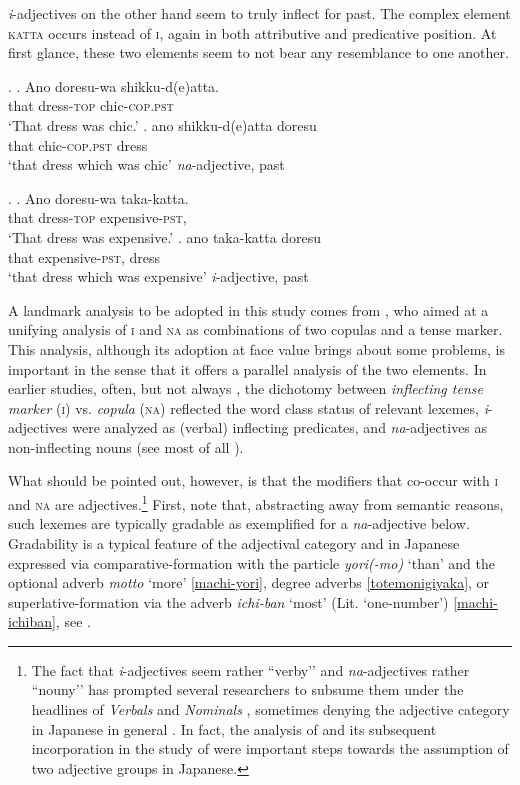 \documentclass [output=book,colorlinks,citecolor=brown]{langscibook}
\begin{document}
\textit{i}-adjectives on the other hand seem to truly inflect for past. The complex element \textsc{katta} occurs instead of \textsc{i}, again in both attributive and predicative position. At first glance, these two elements seem to not bear any resemblance to one another. %

\ex. \ag. Ano doresu-wa shikku-d(e)atta.\\
that dress-\textsc{top} chic-\textsc{cop.pst}\\
`That dress was chic.'
\bg. ano shikku-d(e)atta doresu\\
that chic-\textsc{cop.pst} dress\\
`that dress which was chic' \null \hfill \textit{na}-adjective, past

\ex. \label{taka-katta} \ag. Ano doresu-wa taka-katta.\\
that dress-\textsc{top} expensive-\textsc{pst},\\
`That dress was expensive.'
\bg. ano taka-katta doresu\\
that expensive-\textsc{pst}, dress\\
`that dress which was expensive' \null \hfill \textit{i}-adjective, past

A landmark analysis to be adopted in this study comes from \citet{nishiyama:1999:adj}, who aimed at a unifying analysis of \textsc{i} and \textsc{na} as combinations of two copulas and a tense marker. This analysis, although its adoption at face value brings about some problems, is important in the sense that it offers a parallel analysis of the two elements. In earlier studies, often, but not always \citep{backhouse:1984:have}, the dichotomy between \textit{inflecting tense marker} (\textsc{i}) vs. \textit{copula} (\textsc{na}) reflected the word class status of relevant lexemes, \textit{i}-adjectives were analyzed as (verbal) inflecting predicates, and \textit{na}-adjectives as non-inflecting nouns (see most of all \citealt{uehara:1998:syntactic}).

What should be pointed out, however, is that the modifiers that co-occur with \textsc{i} and \textsc{na} are adjectives.\footnote{The fact that \textit{i}-adjectives seem rather ``verby’’ and \textit{na}-adjectives rather ``nouny’’ has prompted several researchers to subsume them under the headlines of \textit{Verbals} and \textit{Nominals} \citep{uehara:1998:syntactic}, sometimes denying the adjective category in Japanese in general \citep{wetzer:1996:typology}. In fact, the analysis of \citet{nishiyama:1999:adj} and its subsequent incorporation in the study of \citet{baker:2003:cat} were important steps towards the assumption of two adjective groups in Japanese.} First, note that, abstracting away from semantic reasons, such lexemes are typically gradable as exemplified for a \textit{na}-adjective below. Gradability is a typical feature of the adjectival category \citep{baker:2003:cat, dixon:2010:grammatical} and in Japanese expressed via comparative-formation with the particle \textit{yori(-mo)} `than' and the optional adverb \textit{motto} `more' \ref{machi-yori}, degree adverbs \ref{totemonigiyaka}, or superlative-formation via the adverb \textit{ichi-ban} `most' (Lit. `one-number') \ref{machi-ichiban}, see \citet{bhatt:2011:reduced}.
\end{document}
